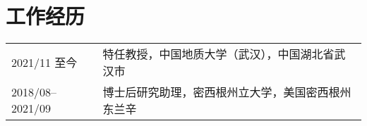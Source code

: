 \section*{工作经历}

\begin{tabular}{p{} p{}}
2021/11 至今 & 特任教授，中国地质大学（武汉），中国湖北省武汉市 \\
2018/08--2021/09 & 博士后研究助理，密西根州立大学，美国密西根州东兰辛 \\
\end{tabular}
